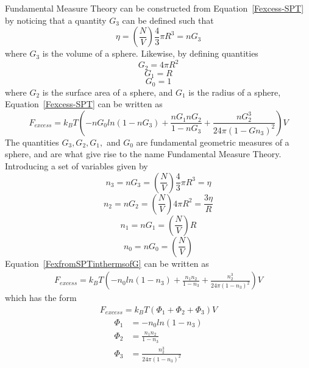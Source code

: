 \documentclass[double,12pt]{beavtex}
\begin{document}
Fundamental Measure Theory can be constructed from Equation~\ref{Fexcess-SPT}  
%
by noticing that a quantity $G_{3}$ can be defined such that
\begin{equation}{\eta =\left(\frac{N}{V}\right)\frac{4}{3}\pi{R^3}=nG_{3}}\end{equation}
where $G_{3}$ is the volume of a sphere. 
Likewise, by defining quantities
\begin{equation}{G_{2}=4\pi{R^2}}\end{equation}
\begin{equation}{G_{1}=R}\end{equation}
\begin{equation}{G_{0}=1}\end{equation}
where $G_{2}$ is the surface area of a sphere, and $G_{1}$ is the 
radius of a sphere, Equation~\ref{Fexcess-SPT} can be written as
\begin{equation}\label{FexfromSPTinthermsofG}{F_{excess}=k_{B}T\left(-nG_{0}ln(1-nG_{3})+\frac{nG_{1}nG_{2}}{1-nG_{3}}+\frac{nG_{2}^3}{24\pi(1-Gn_{3})^2}\right)V}\end{equation}
The quantities $G_{3}, G_{2}, G_{1},$ and $G_{0}$ are fundamental 
geometric measures of a sphere, and are what give rise to the name
Fundamental Measure Theory. Introducing a set of variables
given by
\begin{equation}\label{n3}{n_{3}=nG_{3}=\left(\frac{N}{V}\right)\frac{4}{3}\pi{R^3}=\eta}\end{equation}
\begin{equation}\label{n2}{n_{2}=nG_{2}=\left(\frac{N}{V}\right)4\pi{R^2}=\frac{3\eta}{R}}\end{equation}
\begin{equation}\label{n1}{n_{1}=nG_{1}=\left(\frac{N}{V}\right)R}\end{equation}
\begin{equation}\label{n0}{n_{0}=nG_{0}=\left(\frac{N}{V}\right)}\end{equation}
Equation~\ref{FexfromSPTinthermsofG} can be written as
\begin{align}\label{FexfromSPT}
    F_{excess}=k_{B}T\left(-n_{0}ln(1-n_{3})+\frac{n_{1}n_{2}}{1-n_{3}}+\frac{n_{2}^3}{24\pi(1-n_{3})^2}\right)V
\end{align}
which has the form 
\begin{align}
    F_{excess} = k_BT(\Phi_1+\Phi_2+\Phi_3)V
\end{align}
\begin{align}
   \Phi_1 &= -n_{0}ln(1-n_{3}) \\
   \Phi_2 &= \frac{n_{1}n_{2}}{1-n_{3}} \\
   \Phi_3 &= \frac{n_{2}^3}{24\pi(1-n_{3})^2}   \label{oldPhi3equation}
\end{align}
\end{document}
